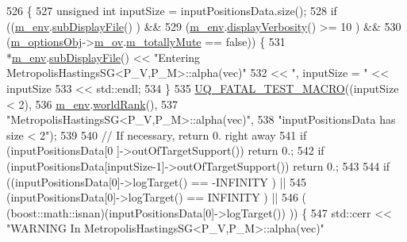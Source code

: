 \begin{DoxyCode}
526 \{
527   \textcolor{keywordtype}{unsigned} \textcolor{keywordtype}{int} inputSize = inputPositionsData.size();
528   \textcolor{keywordflow}{if} ((\hyperlink{class_q_u_e_s_o_1_1_metropolis_hastings_s_g_ac8ea061e55b920e0c8f9bce5c3f20e52}{m\_env}.\hyperlink{class_q_u_e_s_o_1_1_base_environment_a8a0064746ae8dddfece4229b9ad374d6}{subDisplayFile}()                   ) &&
529       (\hyperlink{class_q_u_e_s_o_1_1_metropolis_hastings_s_g_ac8ea061e55b920e0c8f9bce5c3f20e52}{m\_env}.\hyperlink{class_q_u_e_s_o_1_1_base_environment_a1fe5f244fc0316a0ab3e37463f108b96}{displayVerbosity}() >= 10           ) &&
530       (\hyperlink{class_q_u_e_s_o_1_1_metropolis_hastings_s_g_a5d0bc9f73d50d272aa6bfb5ef5939ef3}{m\_optionsObj}->\hyperlink{class_q_u_e_s_o_1_1_metropolis_hastings_s_g_options_a9d4792d9fc2dc5439b8ab489b0c236eb}{m\_ov}.\hyperlink{class_q_u_e_s_o_1_1_mh_options_values_af812309e81191e88dfdc87c5815141a3}{m\_totallyMute} == \textcolor{keyword}{false})) \{
531     *\hyperlink{class_q_u_e_s_o_1_1_metropolis_hastings_s_g_ac8ea061e55b920e0c8f9bce5c3f20e52}{m\_env}.\hyperlink{class_q_u_e_s_o_1_1_base_environment_a8a0064746ae8dddfece4229b9ad374d6}{subDisplayFile}() << \textcolor{stringliteral}{"Entering MetropolisHastingsSG<P\_V,P\_M>::alpha(vec)"}
532                            << \textcolor{stringliteral}{", inputSize = "} << inputSize
533                            << std::endl;
534   \}
535   \hyperlink{_defines_8h_a56d63d18d0a6d45757de47fcc06f574d}{UQ\_FATAL\_TEST\_MACRO}((inputSize < 2),
536                       \hyperlink{class_q_u_e_s_o_1_1_metropolis_hastings_s_g_ac8ea061e55b920e0c8f9bce5c3f20e52}{m\_env}.\hyperlink{class_q_u_e_s_o_1_1_base_environment_a78b57112bbd0e6dd0e8afec00b40ffa7}{worldRank}(),
537                       \textcolor{stringliteral}{"MetropolisHastingsSG<P\_V,P\_M>::alpha(vec)"},
538                       \textcolor{stringliteral}{"inputPositionsData has size < 2"});
539 
540   \textcolor{comment}{// If necessary, return 0. right away}
541   \textcolor{keywordflow}{if} (inputPositionsData[0          ]->outOfTargetSupport()) \textcolor{keywordflow}{return} 0.;
542   \textcolor{keywordflow}{if} (inputPositionsData[inputSize-1]->outOfTargetSupport()) \textcolor{keywordflow}{return} 0.;
543 
544   \textcolor{keywordflow}{if} ((inputPositionsData[0]->logTarget() == -INFINITY           ) ||
545       (inputPositionsData[0]->logTarget() ==  INFINITY           ) ||
546       ( (boost::math::isnan)(inputPositionsData[0]->logTarget()) )) \{
547     std::cerr << \textcolor{stringliteral}{"WARNING In MetropolisHastingsSG<P\_V,P\_M>::alpha(vec)"}

\end{DoxyCode}
